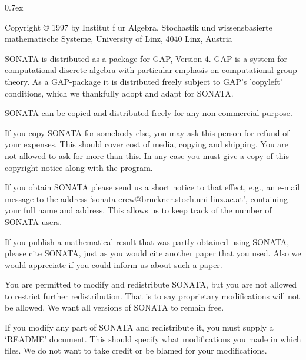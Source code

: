 


\begingroup
\def\"#1{\accent127 #1}
\parindent 0pt
\parskip 0.7ex

{\everypar{\hangindent\manindent}
Copyright {\copyright} 1997 by\hfill\break
        Institut f\"ur Algebra, Stochastik und
        wissensbasierte mathematische Systeme,\hfill\break
        University of Linz, 4040 Linz, Austria}

\medskip

SONATA  is  distributed as a package for GAP, Version 4.  GAP  is a
system  for  computational  discrete algebra with  particular emphasis on
computational  group  theory.  As a GAP-package it  is  distributed
freely subject to GAP's 'copyleft' conditions, which  we thankfully adopt
and adapt for SONATA. 

SONATA   can be copied   and  distributed freely  for any  non-commercial
purpose.

If you copy SONATA for somebody else, you may ask this person for  refund
of your expenses.  This should cover cost of media, copying and shipping.
You are not allowed to ask for more than this.  In any case you must give
a copy of this copyright notice along with the program.

If you obtain SONATA please send us  a short notice to that effect, e.g.,
an  e-mail  message   to  the  address
`sonata-crew@bruckner.stoch.uni-linz.ac.at',
containing your full  name and address.  This  allows us to keep track of
the number of SONATA users.

If you  publish  a mathematical  result  that  was  partly obtained using
SONATA, please cite SONATA, just as you would cite another paper that you
used.\* Also   we would appreciate if you   could inform us  about such a
paper.

You  are permitted  to modify and  redistribute  SONATA,  but you are not
allowed  to restrict further redistribution.  That is to say  proprietary
modifications will  not  be allowed.  We want all  versions  of SONATA to
remain free.

If you  modify any part of SONATA and redistribute it,  you must supply a
`README'  document.   This should specify what modifications you made  in
which  files.  We do  not  want  to take  credit  or  be blamed  for your
modifications.

